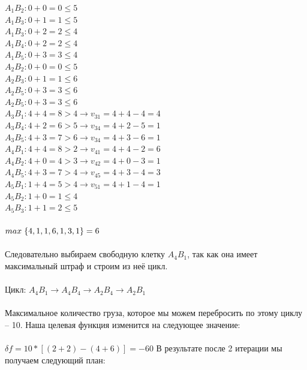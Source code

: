 \documentclass[14pt,a4paper,fleqn]{extarticle}
\begin{document}
$A_1B_2: 0 + 0 = 0 \leq 5$\\
$A_1B_3: 0 + 1 = 1 \leq 5$\\
$A_1B_3: 0 + 2 = 2 \leq 4$\\
$A_1B_4: 0 + 2 = 2 \leq 4$\\
$A_1B_5: 0 + 3 = 3 \leq 4$\\
$A_2B_2: 0 + 0 = 0 \leq 5$\\
$A_2B_3: 0 + 1 = 1 \leq 6$\\
$A_2B_5: 0 + 3 = 3 \leq 6$\\
$A_2B_5: 0 + 3 = 3 \leq 6$\\
$A_3B_1: 4 + 4 = 8 > 4 \rightarrow v_{31} = 4 + 4 - 4 = 4$\\
$A_3B_4: 4 + 2 = 6 > 5 \rightarrow v_{34} = 4 + 2 - 5 = 1$\\
$A_3B_5: 4 + 3 = 7 > 6 \rightarrow v_{34} = 4 + 3 - 6 = 1$\\
$A_4B_1: 4 + 4 = 8 > 2 \rightarrow v_{41} = 4 + 4 - 2 = 6$\\
$A_4B_2: 4 + 0 = 4 > 3 \rightarrow v_{42} = 4 + 0 - 3 = 1$\\
$A_4B_5: 4 + 3 = 7 > 4 \rightarrow v_{45} = 4 + 3 - 4 = 3$\\
$A_5B_1: 1 + 4 = 5 > 4 \rightarrow v_{51} = 4 + 1 - 4 = 1$\\
$A_5B_2: 1 + 0 = 1 \leq 4$\\
$A_5B_3: 1 + 1 = 2 \leq 5$\\\\
$max\hspace*{0.1cm}\{4,1,1,6,1,3,1\} = 6$\\\\
Следовательно выбираем свободную клетку $A_4B_1$, так как она имеет максимальный штраф и строим из неё цикл.\\\\
Цикл: $A_4B_1 \rightarrow A_4B_4 \rightarrow A_2B_4 \rightarrow A_2B_1$\\\\
Максимальное количество груза, которое мы можем перебросить по этому циклу -- 10. Наша целевая функция изменится на следующее значение:\\\\
$\delta f = 10*[(2+2)-(4+6)] = -60$
\newpage
В результате после 2 итерации мы получаем следующий план:
\end{document}
